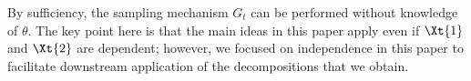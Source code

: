 \documentclass[12pt]{article}
\begin{document}
By sufficiency, the sampling mechanism $G_t$  can be performed without knowledge of $\theta$.
The key point here is that the main ideas in this paper apply even if $\Xt{1}$ and $\Xt{2}$ are dependent; however, we focused on independence in this paper to facilitate downstream application of the decompositions that we obtain. 




\end{document}
